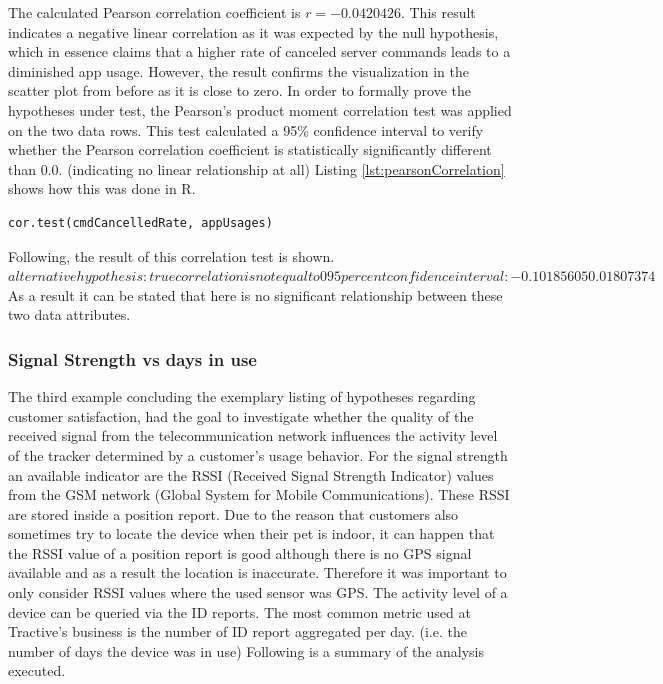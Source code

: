 \begin{enumerate}
	The calculated Pearson correlation coefficient is $r = -0.0420426$. 
	This result indicates a negative linear correlation as it was expected by the null hypothesis, which in essence claims that a higher rate of canceled server commands leads to a diminished app usage. However, the result confirms the visualization in the scatter plot from before as it is close to zero.
	In order to formally prove the hypotheses under test, the Pearson's product moment correlation test was applied on the two data rows. This test calculated a 95\% confidence interval to verify whether the Pearson correlation coefficient is statistically significantly different than $0.0$. (indicating no linear relationship at all) Listing \ref{lst:pearsonCorrelation} shows how this was done in R. 
	
	\begin{lstlisting}[caption={Pearson correlation test in R}, label={lst:pearsonCorrelation}]
	cor.test(cmdCancelledRate, appUsages)
	\end{lstlisting}
	
	Following, the result of this correlation test is shown.
	$
	alternative hypothesis: true correlation is not equal to 0
	95 percent confidence interval:
	-0.10185605  0.01807374
	$
	As a result it can be stated that here is no significant relationship between these two data attributes. 
\end{enumerate}

\subsubsection{Signal Strength vs days in use}
The third example concluding the exemplary listing of hypotheses regarding customer satisfaction, had the goal to investigate whether the quality of the received signal from the telecommunication network influences the activity level of the tracker determined by a customer's usage behavior. For the signal strength an available indicator are the RSSI (Received Signal Strength Indicator) values from the GSM network (Global System for Mobile Communications). These RSSI are stored inside a position report. Due to the reason that customers also sometimes try to locate the device when their pet is indoor, it can happen that the RSSI value of a position report is good although there is no GPS signal available and as a result the location is inaccurate. Therefore it was important to only consider RSSI values where the used sensor was GPS. The activity level of a device can be queried via the ID reports. The most common metric used at Tractive's business is the number of ID report aggregated per day. (i.e. the number of days the device was in use) Following is a summary of the analysis executed. 

